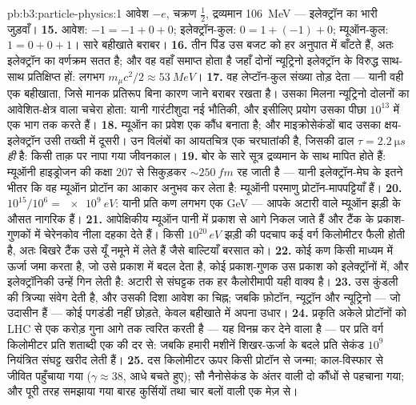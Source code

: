 \begin{solution}{pb:b3:particle-physics:1}
आवेश $-e$, चक्रण $\tfrac12$, द्रव्यमान \qty{106}{MeV} ---
इलेक्ट्रॉन का भारी जुड़वाँ।
\textbf{15.} आवेश: $-1 = -1 + 0 + 0$; इलेक्ट्रॉन-कुल:
$0 = 1 + (-1) + 0$; म्यूऑन-कुल: $1 = 0 + 0 + 1$। सारे बहीखाते
बराबर।
\textbf{16.} तीन पिंड उस बजट को हर अनुपात में बाँटते हैं,
अतः इलेक्ट्रॉन का वर्णक्रम सतत है; और वह वहाँ समाप्त होता है जहाँ
दोनों न्यूट्रिनो इलेक्ट्रॉन के विरुद्ध साथ-साथ प्रतिक्षिप्त हों:
लगभग $m_\mu c^2/2 \approx \qty{53}{MeV}$।
\textbf{17.} वह लेप्टॉन-कुल संख्या तोड़ देता --- यानी वही एक
बहीखाता, जिसे मानक प्रतिरूप बिना कारण जाने बराबर रखता है। उसका मिलना
न्यूट्रिनो दोलनों का आवेशित-क्षेत्र वाला चचेरा होता:
यानी गारंटीशुदा नई भौतिकी, और इसीलिए प्रयोग उसका पीछा
$10^{13}$ में एक भाग तक करते हैं।
\textbf{18.} म्यूऑन का प्रवेश एक कौंध बनाता है; और माइक्रोसेकंडों
बाद उसका क्षय-इलेक्ट्रॉन उसी तख्ती में दूसरी। उन विलंबों का
आयतचित्र एक चरघातांकी है, जिसकी ढाल
$\tau = \qty{2.2}{\micro s}$ \emph{ही} है: किसी ताक़ पर नापा गया जीवनकाल।
\textbf{19.} बोर के सारे सूत्र द्रव्यमान के साथ मापित होते हैं:
म्यूऑनी हाइड्रोजन की कक्षा $207$ से सिकुड़कर ${\sim}\qty{250}{fm}$
रह जाती है --- यानी इलेक्ट्रॉन-मेघ के इतने भीतर कि वह म्यूऑन
प्रोटॉन का आकार अनुभव कर लेता है: म्यूऑनी परमाणु प्रोटॉन-मापपट्टियाँ हैं।
\textbf{20.} $10^{15}/10^{6} = \qty{e9}{eV}$: यानी प्रति कण लगभग
एक \unit{GeV} --- आपके अटारी वाले म्यूऑन झड़ी के औसत नागरिक हैं।
\textbf{21.} आपेक्षिकीय म्यूऑन पानी में प्रकाश से आगे निकल जाते
हैं और टैंक के प्रकाश-गुणकों में चेरेनकोव नीला दहका देते हैं। किसी
$10^{20}\,\unit{eV}$ झड़ी की पदचाप कई वर्ग
किलोमीटर फैली होती है, अतः बिखरे टैंक उसे यूँ नमूने में लेते हैं जैसे
बाल्टियाँ बरसात को।
\textbf{22.} कोई कण किसी माध्यम में ऊर्जा जमा करता है, जो उसे
प्रकाश में बदल देता है, कोई प्रकाश-गुणक उस प्रकाश को
इलेक्ट्रॉनों में, और इलेक्ट्रॉनिकी उन्हें गिन लेती है: अटारी से
संघट्टक तक हर कैलोरीमापी यही वाक्य है।
\textbf{23.} उस कुंडली की त्रिज्या संवेग देती है, और उसकी दिशा
आवेश का चिह्न; जबकि फ़ोटॉन, न्यूट्रॉन और न्यूट्रिनो ---
जो उदासीन हैं --- कोई पगडंडी नहीं छोड़ते, केवल बहीखाते में अपना
उधार।
\textbf{24.} प्रकृति अकेले प्रोटॉनों को LHC से एक करोड़
गुना आगे तक त्वरित करती है --- यह विनम्र कर देने वाला है --- पर प्रति वर्ग
किलोमीटर प्रति शताब्दी एक की दर से: जबकि हमारी मशीनें शिखर-ऊर्जा के
बदले प्रति सेकंड $10^{9}$ नियंत्रित संघट्ट खरीद लेती हैं।
\textbf{25.} दस किलोमीटर ऊपर किसी प्रोटॉन से जन्मा; काल-विस्फार से
जीवित पहुँचाया गया ($\gamma \approx 38$, आधे बचते हुए);
सौ नैनोसेकंड के अंतर वाली दो कौंधों से पहचाना गया; और
पूरी तरह समझाया गया बारह कुर्सियों तथा चार बलों वाली
एक मेज़ से।
\end{solution}
